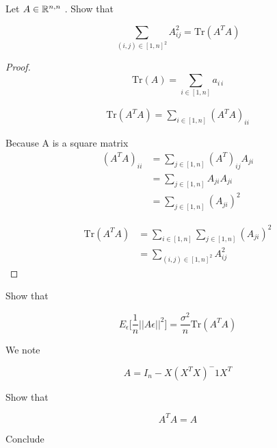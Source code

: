 
Let $A \in \mathbb{R} ^{n, n}$ . Show that

\begin{equation}
    \sum_{(i, j)  \in [1, n]^2} A^2_{ij} =  \mathrm {Tr} (A^T A)
\end{equation}



\begin{proof}
    \begin{equation}
        \mathrm {Tr} (A) =\sum _{i\in[1, n]} a_{{i\,i}}
    \end{equation}
    
    \begin{align*}
        \mathrm {Tr} (A^T A) = \sum_{i \in [1, n]} (A^T A)_{ii}
    \end{align*}

    Because A is a square matrix
    \begin{align*}
        (A^T A)_{ii} &= \sum_{j \in [1, n]} (A^T)_{ij} A_{ji} \\
            &= \sum_{j \in [1, n]} A_{ji} A_{ji}\\
            &= \sum_{j \in [1, n]} (A_{ji})^2
    \end{align*}

    \begin{align*}
         \mathrm {Tr} (A^T A) &= \sum_{i \in [1, n]}  \sum_{j \in [1, n]} (A_{ji})^2\\
            &= \sum_{(i, j)  \in [1, n]^2} A^2_{ij}      
    \end{align*}
\end{proof}


Show that 

\begin{equation}
    E_\epsilon \Big[ \frac{1}{n} ||A\epsilon ||^2 \Big] = \frac{\sigma^2}{n} \mathrm {Tr} (A^T A)
\end{equation}


We note

\begin{equation}
    A = I_n - X (X^T X)^-1 X^T
\end{equation}

Show that

\begin{equation}
    A^T A = A
\end{equation}


Conclude
